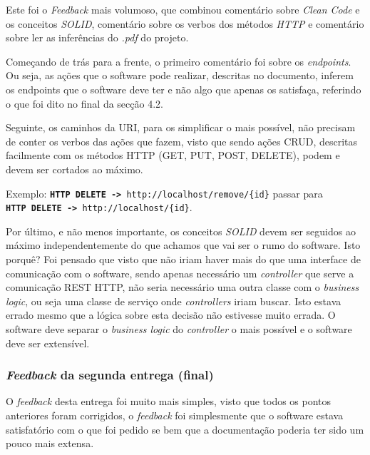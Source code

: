 Este foi o \textit{Feedback} mais volumoso, que combinou comentário sobre \textit{Clean Code} e os conceitos \textit{SOLID}, comentário sobre os verbos dos métodos \textit{HTTP} e comentário sobre ler as inferências do \textit{.pdf} do projeto.

Começando de trás para a frente, o primeiro comentário foi sobre os \textit{endpoints}. Ou seja, as ações que o software pode realizar, descritas no documento, inferem os endpoints que o software deve ter e não algo que apenas os satisfaça, referindo o que foi dito no final da secção 4.2.

Seguinte, os caminhos da URI, para os simplificar o mais possível, não precisam de conter os verbos das ações que fazem, visto que sendo ações CRUD, descritas facilmente com os métodos HTTP (GET, PUT, POST, DELETE), podem e devem ser cortados ao máximo.

Exemplo: \texttt{\textbf{HTTP DELETE ->} http://localhost/remove/\{id\}} passar para\\\texttt{\textbf{HTTP DELETE ->} http://localhost/\{id\}}.

Por último, e não menos importante, os conceitos \textit{SOLID} devem ser seguidos ao máximo independentemente do que achamos que vai ser o rumo do software. Isto porquê? Foi pensado que visto que não iriam haver mais do que uma interface de comunicação com o software, sendo apenas necessário um \textit{controller} que serve a comunicação REST HTTP, não seria necessário uma outra classe com o \textit{business logic}, ou seja uma classe de serviço onde \textit{controllers} iriam buscar. Isto estava errado mesmo que a lógica sobre esta decisão não estivesse muito errada. O software deve separar o \textit{business logic} do \textit{controller} o mais possível e o software deve ser extensível.

\subsubsection{\textit{Feedback} da segunda entrega (final)}

O \textit{feedback} desta entrega foi muito mais simples, visto que todos os pontos anteriores foram corrigidos, o \textit{feedback} foi simplesmente que o software estava satisfatório com o que foi pedido se bem que a documentação poderia ter sido um pouco mais extensa.
